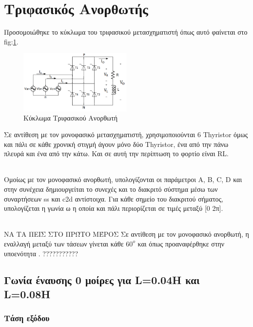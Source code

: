 \section{Τριφασικός Ανορθωτής}

Προσομοιώθηκε το κύκλωμα του τριφασικού μετασχηματιστή όπως αυτό φαίνεται στο fig:\ref{img:3_phase}.
\begin{figure}[h]
	\centering
	\includegraphics[width = 0.5\textwidth]{Images/3_phase.png}
	\caption{Κύκλωμα Τριφασικού Ανορθωτή}
	\label{img:3_phase}
\end{figure}

\noindent
Σε αντίθεση με τον μονοφασικό μετασχηματιστή, χρησιμοποιούνται 6 Thyristor όμως και πάλι σε κάθε χρονική στιγμή άγουν μόνο δύο Thyristor, ένα από την πάνω πλευρά και ένα από την κάτω. Και σε αυτή την περίπτωση το φορτίο είναι RL.

\noindent\\
Ομοίως με τον μονοφασικό ανορθωτή, υπολογίζονται οι παράμετροι Α, Β, C, D και στην συνέχεια δημιουργείται το συνεχές και το διακριτό σύστημα μέσω των συναρτήσεων ss και c2d αντίστοιχα. Για κάθε σημείο του διακριτού σήματος, υπολογίζεται η γωνία ω η οποία και πάλι περιορίζεται σε τιμές μεταξύ [0 2π].

\noindent\\
ΝΑ ΤΑ ΠΕΙΣ ΣΤΟ ΠΡΏΤΟ ΜΈΡΟΣ
Σε αντίθεση με τον μονοφασικό ανορθωτή, η εναλλαγή μεταξύ των τάσεων γίνεται κάθε $60^o$ και όπως προαναφέρθηκε στην υποενότητα .  ???????????

\subsection{Γωνία έναυσης 0 μοίρες για L=0.04Η και L=0.08Η}

\subsubsection{Τάση εξόδου}

